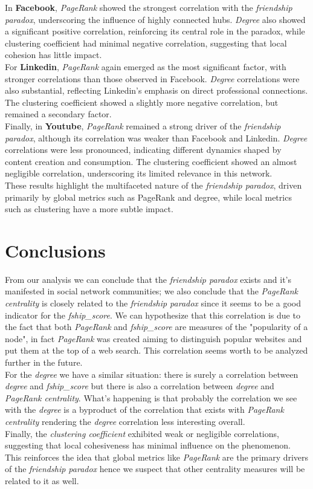 \documentclass{article}
\begin{document}
In \textbf{Facebook}, \textit{PageRank} showed the strongest correlation with the \textit{friendship paradox}, underscoring the influence of highly connected hubs. \textit{Degree} also showed a significant positive correlation, reinforcing its central role in the paradox, while clustering coefficient had minimal negative correlation, suggesting that local cohesion has little impact. \\
For \textbf{Linkedin}, \textit{PageRank} again emerged as the most significant factor, with stronger correlations than those observed in Facebook. \textit{Degree} correlations were also substantial, reflecting Linkedin's emphasis on direct professional connections. The clustering coefficient showed a slightly more negative correlation, but remained a secondary factor. \\ 
Finally, in \textbf{Youtube}, \textit{PageRank} remained a strong driver of the \textit{friendship paradox}, although its correlation was weaker than Facebook and Linkedin. \textit{Degree} correlations were less pronounced, indicating different dynamics shaped by content creation and consumption. The clustering coefficient showed an almost negligible correlation, underscoring its limited relevance in this network. \\
These results highlight the multifaceted nature of the \textit{friendship paradox}, driven primarily by global metrics such as PageRank and degree, while local metrics such as clustering have a more subtle impact.

\section{Conclusions}
From our analysis we can conclude that the \textit{friendship paradox} exists and it's manifested in social network communities; we also conclude that the \textit{PageRank centrality} is closely related to the \textit{friendship paradox} since it seems to be a good indicator for the \textit{fship\_score}. We can hypothesize that this correlation is due to the fact that both \textit{PageRank} and \textit{fship\_score} are measures of the "popularity of a node", in fact \textit{PageRank} was created aiming to distinguish popular websites and put them at the top of a web search. This correlation seems worth to be analyzed further in the future. \\
For the \textit{degree} we have a similar situation: there is surely a correlation between \textit{degree} and \textit{fship\_score} but there is also a correlation between \textit{degree} and \textit{PageRank centrality}. What's happening is that probably the correlation we see with the \textit{degree} is a byproduct of the correlation that exists with \textit{PageRank centrality} rendering the \textit{degree} correlation less interesting overall.\\
Finally, the \textit{clustering coefficient} exhibited weak or negligible correlations, suggesting that local cohesiveness has minimal influence on the phenomenon. 
This reinforces the idea that global metrics like \textit{PageRank} are the primary drivers of the \textit{friendship paradox} hence we suspect that other centrality measures will be related to it as well.
\end{document}
